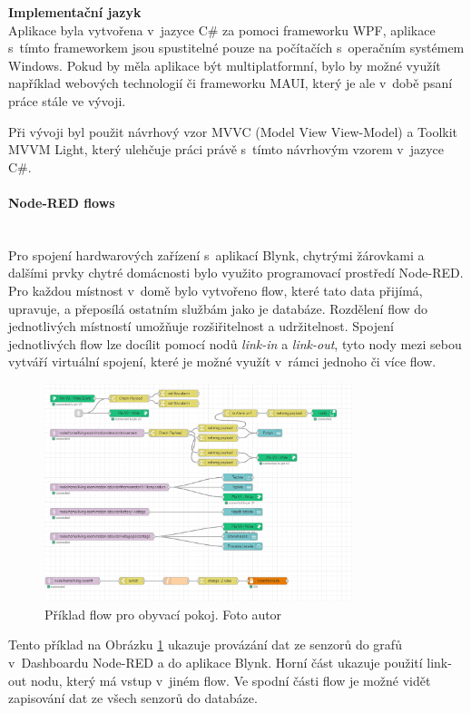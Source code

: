 \noindent\textbf{Implementační jazyk}\mbox{} \\
Aplikace byla vytvořena v~jazyce C\# za pomoci frameworku WPF, aplikace s~tímto frameworkem jsou spustitelné pouze na počítačích s~operačním systémem Windows. Pokud by měla aplikace být multiplatformní, bylo by možné využít například webových technologií či frameworku MAUI, který je ale v~době psaní práce stále ve vývoji.

Při vývoji byl použit návrhový vzor MVVC (Model View View-Model) a Toolkit MVVM Light, který ulehčuje práci právě s~tímto návrhovým vzorem v~jazyce C\#.

\paragraph*{Node-RED flows}\mbox{} \\
Pro spojení hardwarových zařízení s~aplikací Blynk, chytrými žárovkami a dalšími prvky chytré domácnosti bylo využito programovací prostředí Node-RED.
Pro každou místnost v~domě bylo vytvořeno flow, které tato data přijímá, upravuje, a přeposílá ostatním službám jako je databáze.
Rozdělení flow do jednotlivých místností umožňuje rozšiřitelnost a udržitelnost. Spojení jednotlivých flow lze docílit pomocí nodů \emph{link-in} a \emph{link-out}, tyto nody mezi sebou vytváří virtuální spojení, které je možné využít v~rámci jednoho či více flow.

\begin{figure}[H]
  \centering
  \includegraphics[width=0.8\textwidth]{obrazky-figures/flows/livingRoomFlowExample.PNG}
  \caption{Příklad flow pro obyvací pokoj. Foto autor}
  \label{nodeRedFlowExample}
\end{figure}

Tento příklad na Obrázku \ref{nodeRedFlowExample} ukazuje provázání dat ze senzorů do grafů v~Dashboardu Node-RED a do aplikace Blynk.
Horní část ukazuje použití link-out nodu, který má vstup v~jiném flow.
Ve spodní části flow je možné vidět zapisování dat ze všech senzorů do databáze.

